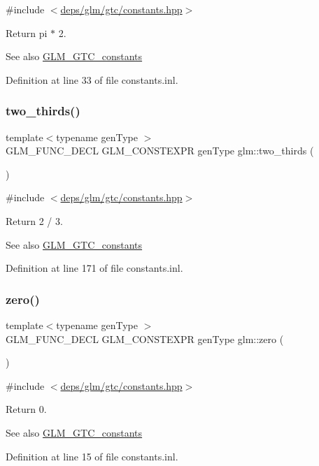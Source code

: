{\ttfamily \#include $<$\hyperlink{constants_8hpp}{deps/glm/gtc/constants.\+hpp}$>$}

Return pi $\ast$ 2. \begin{DoxySeeAlso}{See also}
\hyperlink{group__gtc__constants}{G\+L\+M\+\_\+\+G\+T\+C\+\_\+constants} 
\end{DoxySeeAlso}


Definition at line 33 of file constants.\+inl.

\mbox{\label{group__gtc__constants_ga9b4d2f4322edcf63a6737b92a29dd1f5}} 
\subsubsection{\texorpdfstring{two\+\_\+thirds()}{two\_thirds()}}
{\footnotesize\ttfamily template$<$typename gen\+Type $>$ \\
G\+L\+M\+\_\+\+F\+U\+N\+C\+\_\+\+D\+E\+CL G\+L\+M\+\_\+\+C\+O\+N\+S\+T\+E\+X\+PR gen\+Type glm\+::two\+\_\+thirds (\begin{DoxyParamCaption}{ }\end{DoxyParamCaption})}



{\ttfamily \#include $<$\hyperlink{constants_8hpp}{deps/glm/gtc/constants.\+hpp}$>$}

Return 2 / 3. \begin{DoxySeeAlso}{See also}
\hyperlink{group__gtc__constants}{G\+L\+M\+\_\+\+G\+T\+C\+\_\+constants} 
\end{DoxySeeAlso}


Definition at line 171 of file constants.\+inl.

\mbox{\label{group__gtc__constants_ga788f5a421fc0f40a1296ebc094cbaa8a}} 
\subsubsection{\texorpdfstring{zero()}{zero()}}
{\footnotesize\ttfamily template$<$typename gen\+Type $>$ \\
G\+L\+M\+\_\+\+F\+U\+N\+C\+\_\+\+D\+E\+CL G\+L\+M\+\_\+\+C\+O\+N\+S\+T\+E\+X\+PR gen\+Type glm\+::zero (\begin{DoxyParamCaption}{ }\end{DoxyParamCaption})}



{\ttfamily \#include $<$\hyperlink{constants_8hpp}{deps/glm/gtc/constants.\+hpp}$>$}

Return 0. \begin{DoxySeeAlso}{See also}
\hyperlink{group__gtc__constants}{G\+L\+M\+\_\+\+G\+T\+C\+\_\+constants} 
\end{DoxySeeAlso}


Definition at line 15 of file constants.\+inl.

